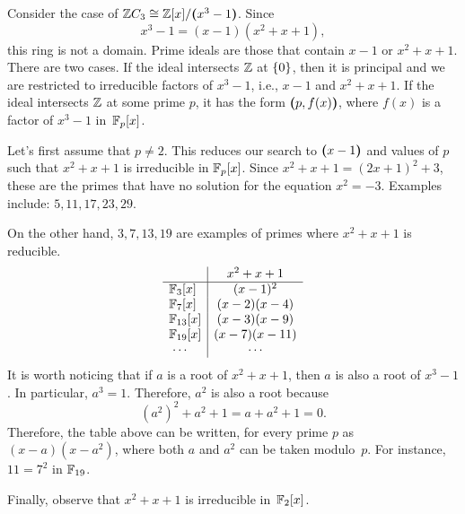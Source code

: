 \begin{xmpl}\label{spectral-diagram-ZC3}
    Consider the case of $\mathbb{Z} C_3\cong\mathbb{Z}[x]/\textrm{\boldmath$($}x^3-1\textrm{\boldmath$)$}$. Since
    $$
        x^3-1=(x-1)(x^2+x+1),
    $$
    this ring is not a domain. Prime ideals are those that contain $x-1$ or $x^2+x+1$. There are two cases. If the ideal intersects $\mathbb{Z}$ at $\{0\}$, then it is principal and we are restricted to irreducible factors of $x^3-1$, i.e., $x-1$ and $x^2+x+1$. If the ideal intersects $\mathbb{Z}$ at some prime $p$, it has the form $\textrm{\boldmath$($}p, f(x)\textrm{\boldmath$)$}$, where $f(x)$ is a factor of $x^3-1$ in~$\mathbb{F}_p[x]$.
    
    Let's first assume that $p\ne2$. This reduces our search to $\textrm{\boldmath$($}x-1\textrm{\boldmath$)$}$ and values of $p$ such that $x^2+x+1$ is irreducible in $\mathbb{F}_p[x]$. Since $x^2+x+1 = (2x+1)^2+3$, these are the primes that have no solution for the equation $x^2=-3$. Examples include: $5, 11, 17, 23, 29$. 
    
    On the other hand, $3, 7, 13, 19$ are examples of primes where $x^2+x+1$ is reducible. 
    \renewcommand{\arraystretch}{1.5}
    $$
        \begin{array}{l|c}
            & x^2+x+1 \\
        \hline
        \mathbb{F}_3[x] & (x-1)^2 \\
        \mathbb{F}_7[x] & (x-2)(x-4) \\
        \mathbb{F}_{13}[x] & (x-3)(x-9) \\
        \mathbb{F}_{19}[x] & (x-7)(x-11) \\
        \;\cdots & \cdots
        \end{array}
    $$
    It is worth noticing that if $a$ is a root of $x^2+x+1$, then $a$ is also a root of $x^3-1$. In particular, $a^3=1$. Therefore, $a^2$ is also a root because
    $$
        (a^2)^2 + a^2 + 1 = a + a^2 + 1 = 0.
    $$
    Therefore, the table above can be written, for every prime $p$ as $(x-a)(x-a^2)$, where both $a$ and $a^2$ can be taken modulo~$p$. For instance, $11=7^2$ in $\mathbb{F}_{19}$.
    
    Finally, observe that $x^2+x+1$ is irreducible in~$\mathbb{F}_2[x]$.


\end{xmpl}
